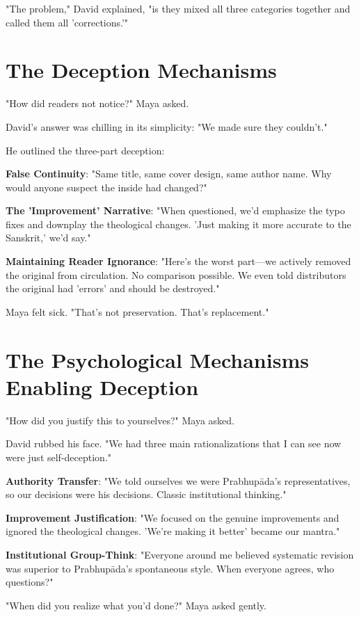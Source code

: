 \documentclass[11pt,twoside]{book}
\begin{document}
"The problem," David explained, "is they mixed all three categories together and called them all 'corrections.'"
\section*{The Deception Mechanisms}
\label{sec:org1e681c8}

"How did readers not notice?" Maya asked.

David's answer was chilling in its simplicity: "We made sure they couldn't."

He outlined the three-part deception:

\textbf{\textbf{False Continuity}}: "Same title, same cover design, same author name. Why would anyone suspect the inside had changed?"

\textbf{\textbf{The 'Improvement' Narrative}}: "When questioned, we'd emphasize the typo fixes and downplay the theological changes. 'Just making it more accurate to the Sanskrit,' we'd say."

\textbf{\textbf{Maintaining Reader Ignorance}}: "Here's the worst part—we actively removed the original from circulation. No comparison possible. We even told distributors the original had 'errors' and should be destroyed."

Maya felt sick. "That's not preservation. That's replacement."
\section*{The Psychological Mechanisms Enabling Deception}
\label{sec:org75930fb}

"How did you justify this to yourselves?" Maya asked.

David rubbed his face. "We had three main rationalizations that I can see now were just self-deception."

\textbf{\textbf{Authority Transfer}}: "We told ourselves we were Prabhupāda's representatives, so our decisions were his decisions. Classic institutional thinking."

\textbf{\textbf{Improvement Justification}}: "We focused on the genuine improvements and ignored the theological changes. 'We're making it better' became our mantra."

\textbf{\textbf{Institutional Group-Think}}: "Everyone around me believed systematic revision was superior to Prabhupāda's spontaneous style. When everyone agrees, who questions?"

"When did you realize what you'd done?" Maya asked gently.
\end{document}
